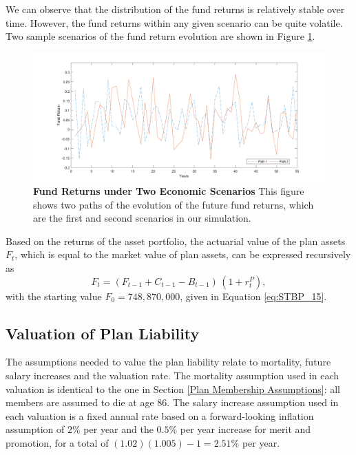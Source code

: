 \documentclass{sfuthesis}
\numberwithin{equation}{chapter}
\begin{document}
	
		\justify
		We can observe that the distribution of the fund returns is relatively stable over time. However, the fund returns within any given scenario can be quite volatile. Two sample scenarios of the fund return evolution are shown in Figure \ref{fig:Fund Returns under Two Economic Scenarios}.
		\begin{figure}[h]
			\includegraphics[width=\linewidth]{ResultPlot/fr1scen.pdf} 
			\caption[Fund Returns under Two Economic Scenarios]{\textbf{Fund Returns under Two Economic Scenarios}
				\vspace{-0.4cm}
				\newline\footnotesize \justify This figure shows two paths of the evolution of the future fund returns, which are the first and second scenarios in our simulation.}
			\label{fig:Fund Returns under Two Economic Scenarios}
		\end{figure}
		Based on the returns of the asset portfolio, the actuarial value of the plan assets $F_t$, which is equal to the market value of plan assets, can be expressed recursively as
		\begin{equation}
		\label{eq:STBP_19}
		F_t = (F_{t-1} + C_{t-1} - B_{t-1})\, (1+r_{t}^{P}),
		\end{equation}
		with the starting value $F_{0} = 748,870,000$, given in Equation \eqref{eq:STBP_15}. 
	
	
	\subsection{Valuation of Plan Liability}
	\label{Valuation of Plan Liability}
	
		\justify
		The assumptions needed to value the plan liability relate to mortality, future salary increases and the valuation rate. The mortality assumption used in each valuation is identical to the one in Section \ref{Plan Membership Assumptions}: all members are assumed to die at age 86. The salary increase assumption used in each valuation is a fixed annual rate based on a forward-looking inflation assumption of $2\%$ per year and the $0.5\%$ per year increase for merit and promotion, for a total of $(1.02)(1.005)-1=2.51\%$ per year.
	
\end{document}
